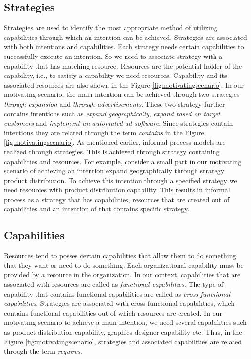 \subsection{Strategies} 
\label{sec:strategies}
Strategies are used to identify the most appropriate method of utilizing capabilities through which an intention can be achieved. Strategies are associated with both intentions and capabilities. Each strategy needs certain capabilities to successfully execute an intention. So we need to associate strategy with a capability that has matching resource. Resources are the potential holder of the capability, i.e., to satisfy a capability we need resources. Capability and its associated resources are also shown in the Figure \ref{fig:motivatingscenario}. In our motivating scenario, the main intention can be achieved through two strategies \textit{through expansion} and \textit{through advertisements}. These two strategy further contains intentions such as \textit{expand geographically}, \textit{expand based on target customers} and \textit{implement an automated ad software}. Since strategies contain intentions they are related through the term \textit{contains} in the Figure \ref{fig:motivatingscenario}. As mentioned earlier, informal process models are realized through strategies. This is achieved through strategy containing capabilities and resources. For example, consider a small part in our motivating scenario of achieving an intention expand geographically through strategy product distribution. To achieve this intention through a specified strategy we need resources with product distribution capability. This results in informal process as a strategy that has capabilities, resources that are created out of capabilities and an intention of that contains specific strategy.

\subsection{Capabilities}
\label{sec:capabilities}
Resources tend to posses certain capabilities that allow them to do something that they want or need to do something. Each organizational capability must be provided by a resource in the organization. In our context, capabilities that are associated with resources are called as \textit{functional capabilities}. The type of capability that contains functional capabilities are called as \textit{cross functional capabilities}. Strategies are associated with cross functional capabilities, which contains functional capabilities out of which resources are created. In our motivating scenario to achieve a main intention, we need several capabilities such as product distribution capability, graphics designer capability etc. Thus, in the Figure \ref{fig:motivatingscenario}, strategies and associated capabilities are related through the term \textit{requires}. 

